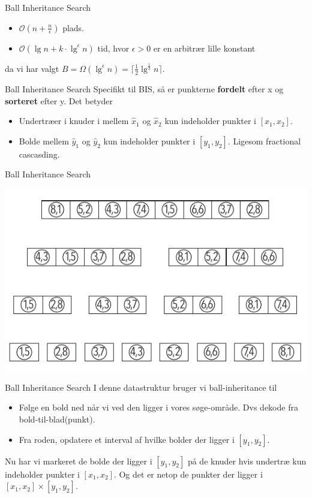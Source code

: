 \documentclass[pdf]{beamer}
\begin{document}
\begin{frame}{Ball Inheritance Search}

  \begin{itemize}
    \item $\mathcal{O}(n + \frac{n}{\epsilon})$ plads.
    \item $\mathcal{O}(\lg n + k\cdot\lg^\epsilon n)$ tid, hvor $\epsilon > 0$ er en arbitrær lille konstant
  \end{itemize}
    da vi har valgt $B = \Omega(\lg^\epsilon n) = \lceil \frac{1}{2}\lg^\frac{1}{3} n \rceil$.
\end{frame}


\begin{frame}{Ball Inheritance Search}
  Specifikt til BIS, så er punkterne \textbf{fordelt} efter x og \textbf{sorteret} efter y. Det betyder
  \begin{itemize}
    \item Undertræer i knuder i mellem $\hat{x}_1$ og $\hat{x}_2$ kun indeholder punkter i $[x_1, x_2]$.
    \item Bolde mellem $\hat{y}_1$ og $\hat{y}_2$ kun indeholder punkter i $[y_1, y_2]$.  Ligesom fractional cascasding.

  \end{itemize}
\end{frame}

\begin{frame}{Ball Inheritance Search}
  \begin{center}
    \includegraphics[scale=1.0]{pictures/bolde_med_to_tal.pdf}
  \end{center}
\end{frame}


\begin{frame}{Ball Inheritance Search}
  I denne datastruktur bruger vi ball-inheritance til
  \begin{itemize}
    \item Følge en bold ned når vi ved den ligger i vores søge-område. Dvs dekode fra bold-til-blad(punkt).
    \item Fra roden, opdatere et interval af hvilke bolder der ligger i $[y_1, y_2]$.
  \end{itemize}

  Nu har vi markeret de bolde der ligger i $[y_1, y_2]$ på de knuder hvis undertræ kun indeholder punkter i $[x_1, x_2]$. Og det er netop de punkter der ligger i $[x_1, x_2] \times [y_1, y_2]$.
\end{frame}
\end{document}
